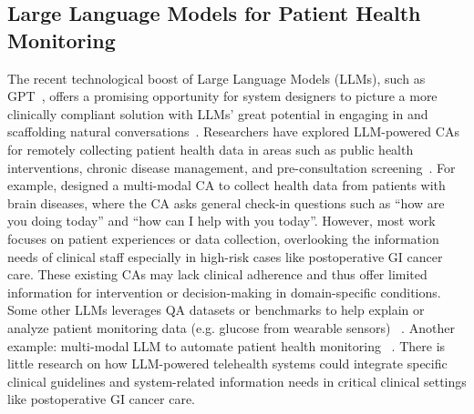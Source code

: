 \subsection{Large Language Models for Patient Health Monitoring}
\label{sub:related_work-3}
The recent technological boost of Large Language Models (LLMs), such as GPT~\cite{OpenAI_2022}, offers a promising opportunity for system designers to picture a more clinically compliant solution with LLMs' great potential in engaging in and scaffolding natural conversations~\cite{yunxiang2023chatdoctor,xiao2020tell, xiao2023supporting,shen2023convxai, hamalainen_evaluating_2023, wang_2023_enabling, liu2023human}. 
Researchers have explored LLM-powered CAs for remotely collecting patient health data in areas such as public health interventions, chronic disease management, and pre-consultation screening~\cite{wei_leveraging_2023, montagna2023data, dwyer2023use, ni2017mandy, li2024beyond, hao2024advancing}. For example, \cite{chira2022affective}  designed a multi-modal CA to collect health data from patients with brain diseases, where the CA asks general check-in questions such as ``how are you doing today'' and ``how can I help with you today''. 
However, most work focuses on patient experiences or data collection, overlooking the information needs of clinical staff especially in high-risk cases like postoperative GI cancer care. These existing CAs may lack clinical adherence and thus offer limited information for intervention or decision-making in domain-specific conditions. 
Some other LLMs leverages QA datasets or benchmarks to help explain or analyze patient monitoring data (e.g. glucose from wearable sensors) ~\cite{ferrara2024large, healey2024llm}. Another example: multi-modal LLM to automate patient health monitoring ~\cite{ho2024remoni}.
There is little research on how LLM-powered telehealth systems could integrate specific clinical guidelines and system-related information needs in critical clinical settings like postoperative GI cancer care.

